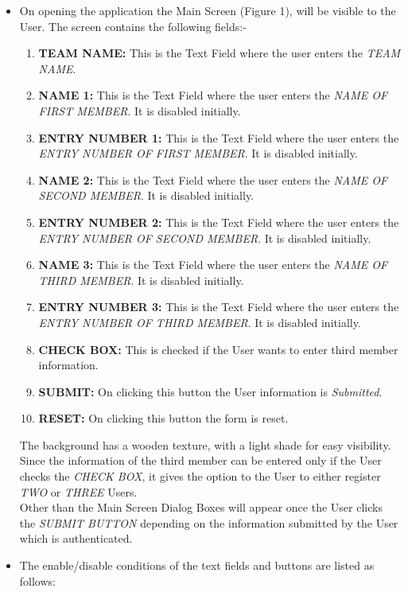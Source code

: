 \documentclass[12pt]{article}
\begin{document}
\begin{itemize}
\item On opening the application the Main Screen (Figure 1), will be visible to the User. The screen contains the following fields:-
\begin{enumerate}
\item \textbf{TEAM NAME:} This is the Text Field where the user enters the \textit{TEAM NAME}. 
\item \textbf{NAME 1:} This is the Text Field where the user enters the \textit{NAME OF FIRST MEMBER}. It is disabled initially.
\item \textbf{ENTRY NUMBER 1:} This is the Text Field where the user enters the \textit{ENTRY NUMBER OF FIRST MEMBER}. It is disabled initially.
\item \textbf{NAME 2:} This is the Text Field where the user enters the \textit{NAME OF SECOND MEMBER}. It is disabled initially.
\item \textbf{ENTRY NUMBER 2:} This is the Text Field where the user enters the \textit{ENTRY NUMBER OF SECOND MEMBER}. It is disabled initially.
\item \textbf{NAME 3:} This is the Text Field where the user enters the \textit{NAME OF THIRD MEMBER}. It is disabled initially.
\item \textbf{ENTRY NUMBER 3:} This is the Text Field where the user enters the \textit{ENTRY NUMBER OF THIRD MEMBER}. It is disabled initially.
\item \textbf{CHECK BOX:} This is checked if the User wants to enter third member information. 
\item \textbf{SUBMIT:} On clicking this button the User information is \textit{Submitted}.
\item \textbf{RESET:} On clicking this button the form is reset.
\end{enumerate}
The background has a wooden texture, with a light shade for easy visibility. Since the information of the third member can be entered only if the User checks the \textit{CHECK BOX}, it gives the option to the User to either register \textit{TWO} or \textit{THREE} Users.
\\
Other than the Main Screen Dialog Boxes will appear once the User clicks the \textit{SUBMIT BUTTON} depending on the information submitted by the User which is authenticated.

\item The enable/disable conditions of the text fields and buttons are listed as follows:
\begin{center}


\end{center}
\end{itemize}
\end{document}
